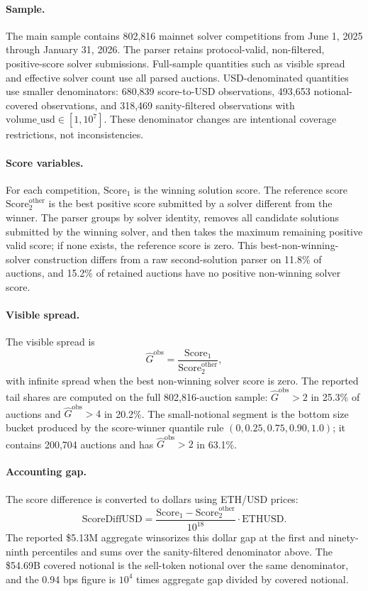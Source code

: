 \documentclass[11pt]{article}
\begin{document}
\paragraph{Sample.}
The main sample contains 802,816 mainnet solver competitions from June 1,
2025 through January 31, 2026. The parser retains protocol-valid,
non-filtered, positive-score solver submissions. Full-sample quantities
such as visible spread and effective solver count use all parsed auctions.
USD-denominated quantities use smaller denominators: 680,839
score-to-USD observations, 493,653 notional-covered observations, and
318,469 sanity-filtered observations with
$\mathrm{volume\_usd}\in[1,10^7]$.
These denominator changes are intentional coverage restrictions, not
inconsistencies.

\paragraph{Score variables.}
For each competition, $\mathrm{Score}_1$ is the winning solution score.
The reference score $\mathrm{Score}^{\mathrm{other}}_2$ is the best
positive score submitted by a solver different from the winner. The
parser groups by solver identity, removes all candidate solutions
submitted by the winning solver, and then takes the maximum remaining
positive valid score; if none exists, the reference score is zero. This
best-non-winning-solver construction differs from a raw second-solution
parser on 11.8\% of auctions, and 15.2\% of retained auctions have no
positive non-winning solver score.

\paragraph{Visible spread.}
The visible spread is
\[
\widehat G^{\mathrm{obs}}
=\frac{\mathrm{Score}_1}{\mathrm{Score}^{\mathrm{other}}_2},
\]
with infinite spread when the best non-winning solver score is zero. The
reported tail shares are computed on the full 802,816-auction sample:
$\widehat G^{\mathrm{obs}}>2$ in 25.3\% of auctions and
$\widehat G^{\mathrm{obs}}>4$ in 20.2\%. The small-notional segment is
the bottom size bucket produced by the score-winner quantile rule
$(0,0.25,0.75,0.90,1.0)$; it contains 200,704 auctions and has
$\widehat G^{\mathrm{obs}}>2$ in 63.1\%.

\paragraph{Accounting gap.}
The score difference is converted to dollars using ETH/USD prices:
\[
\mathrm{ScoreDiffUSD}
=\frac{\mathrm{Score}_1-\mathrm{Score}^{\mathrm{other}}_2}{10^{18}}
\cdot \mathrm{ETHUSD}.
\]
The reported \$5.13M aggregate winsorizes this dollar gap at the first
and ninety-ninth percentiles and sums over the sanity-filtered denominator
above. The \$54.69B covered notional is the sell-token notional over the
same denominator, and the 0.94 bps figure is
$10^4$ times aggregate gap divided by covered notional.
\end{document}
